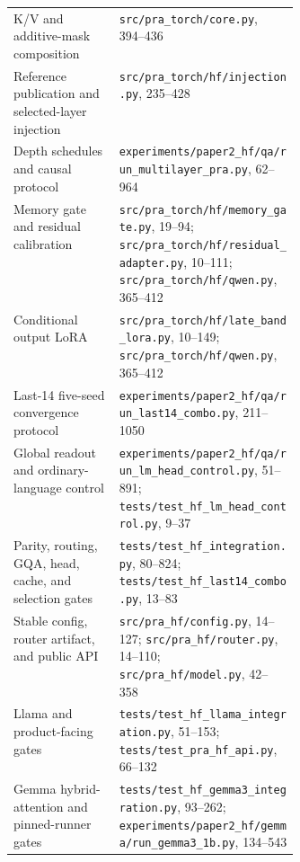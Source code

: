 \documentclass[11pt]{article}
\begin{document}
\begin{table}[H]
\begin{tabularx}{\linewidth}{L{0.37\linewidth}Y}
K/V and additive-mask composition & \texttt{src/pra\_torch/core.py}, 394--436 \\
Reference publication and selected-layer injection & \texttt{src/pra\_torch/hf/injection.py}, 235--428 \\
Depth schedules and causal protocol & \texttt{experiments/paper2\_hf/qa/run\_multilayer\_pra.py}, 62--964 \\
Memory gate and residual calibration & \texttt{src/pra\_torch/hf/memory\_gate.py}, 19--94;
\texttt{src/pra\_torch/hf/residual\_adapter.py}, 10--111;
\texttt{src/pra\_torch/hf/qwen.py}, 365--412 \\
Conditional output LoRA & \texttt{src/pra\_torch/hf/late\_band\_lora.py}, 10--149;
\texttt{src/pra\_torch/hf/qwen.py}, 365--412 \\
Last-14 five-seed convergence protocol & \texttt{experiments/paper2\_hf/qa/run\_last14\_combo.py}, 211--1050 \\
Global readout and ordinary-language control & \texttt{experiments/paper2\_hf/qa/run\_lm\_head\_control.py}, 51--891;
\texttt{tests/test\_hf\_lm\_head\_control.py}, 9--37 \\
Parity, routing, GQA, head, cache, and selection gates & \texttt{tests/test\_hf\_integration.py}, 80--824;
\texttt{tests/test\_hf\_last14\_combo.py}, 13--83 \\
Stable config, router artifact, and public API & \texttt{src/pra\_hf/config.py}, 14--127;
\texttt{src/pra\_hf/router.py}, 14--110; \texttt{src/pra\_hf/model.py}, 42--358 \\
Llama and product-facing gates & \texttt{tests/test\_hf\_llama\_integration.py}, 51--153;
\texttt{tests/test\_pra\_hf\_api.py}, 66--132 \\
Gemma hybrid-attention and pinned-runner gates &
\texttt{tests/test\_hf\_gemma3\_integration.py}, 93--262;
\texttt{experiments/paper2\_hf/gemma/run\_gemma3\_1b.py}, 134--543 \\
\bottomrule
\end{tabularx}
\end{table}



\end{document}
